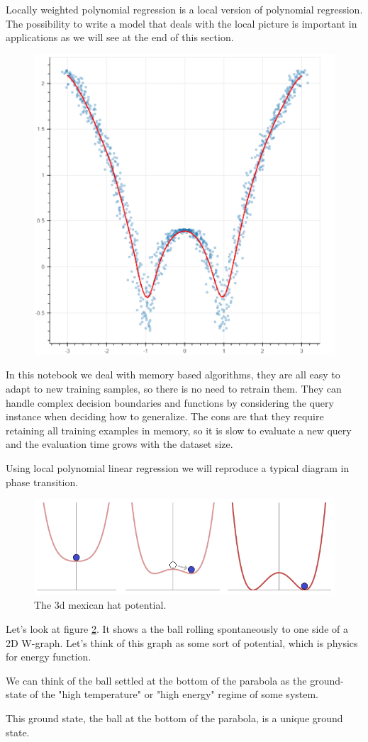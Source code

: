 \documentclass[11pt,letterpaper]{report}
\begin{document}
 Locally weighted polynomial  regression is a local version of polynomial regression.
 The possibility to write a model that deals with the local picture is important in applications as we will see at the end of this section.
 
 \begin{figure}[h!]
 	\centering
 	\includegraphics[width=0.45\linewidth]{figures/bokeh_plot.png}
 	\caption{}
 	\label{fig:knn}
 \end{figure} 	
 In this notebook we deal with  memory based algorithms, 
 they are all easy to adapt to new training samples, so there is no need to retrain them. They 
 can handle complex decision boundaries and functions by considering the query instance when deciding how to generalize.
 The cons are that they require retaining all training examples in memory, so it is slow to evaluate a new query and the evaluation time grows with the dataset size.
  
Using local polynomial linear regression we will reproduce a typical diagram in phase transition.
 \begin{figure}[h!]
	\centering
	\includegraphics[width=0.45\linewidth]{figures/image.png}
	\caption{The 3d mexican hat potential.} 
	\label{fig:face}
\end{figure} 	
Let's look at figure \ref{fig:face}. It shows a the ball rolling spontaneously to one side of a 2D W-graph. Let's think of this graph as some sort of potential, which is physics for energy function.

We can think of the ball settled at the bottom of the parabola as the ground-state of the "high temperature" or "high energy" regime of some system. 

This ground state, the ball at the bottom of the parabola, is a unique ground state. 
\end{document}
